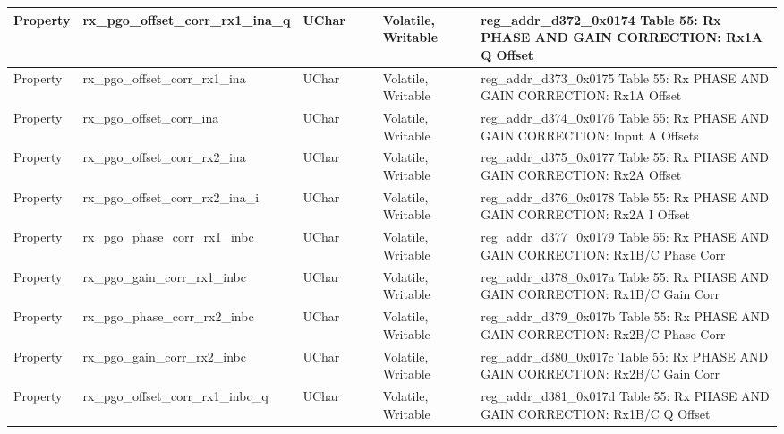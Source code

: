 \documentclass{article}
\begin{document}
\begin{scriptsize}
\begin{longtable}{|p{2cm}|p{5cm}|p{1cm}|p{2cm}|p{2cm}|p{1.75cm}|p{1.5cm}|p{5.1cm}|}
  \hline
  Property & rx\_pgo\_offset\_corr\_rx1\_ina\_q                       & UChar &                  &                  & Volatile,  Writable &         & reg\_addr\_d372\_0x0174 Table 55: Rx PHASE AND GAIN CORRECTION: Rx1A Q Offset \\
  \hline
  Property & rx\_pgo\_offset\_corr\_rx1\_ina                          & UChar &                  &                  & Volatile,  Writable &         & reg\_addr\_d373\_0x0175 Table 55: Rx PHASE AND GAIN CORRECTION: Rx1A Offset \\
  \hline
  Property & rx\_pgo\_offset\_corr\_ina                               & UChar &                  &                  & Volatile,  Writable &         & reg\_addr\_d374\_0x0176 Table 55: Rx PHASE AND GAIN CORRECTION: Input A Offsets \\
  \hline
  Property & rx\_pgo\_offset\_corr\_rx2\_ina                          & UChar &                  &                  & Volatile,  Writable &         & reg\_addr\_d375\_0x0177 Table 55: Rx PHASE AND GAIN CORRECTION: Rx2A Offset \\
  \hline
  Property & rx\_pgo\_offset\_corr\_rx2\_ina\_i                       & UChar &                  &                  & Volatile,  Writable &         & reg\_addr\_d376\_0x0178 Table 55: Rx PHASE AND GAIN CORRECTION: Rx2A I Offset \\
  \hline
  Property & rx\_pgo\_phase\_corr\_rx1\_inbc                          & UChar &                  &                  & Volatile,  Writable &         & reg\_addr\_d377\_0x0179 Table 55: Rx PHASE AND GAIN CORRECTION: Rx1B/C Phase Corr \\
  \hline
  Property & rx\_pgo\_gain\_corr\_rx1\_inbc                           & UChar &                  &                  & Volatile,  Writable &         & reg\_addr\_d378\_0x017a Table 55: Rx PHASE AND GAIN CORRECTION: Rx1B/C Gain Corr \\
  \hline
  Property & rx\_pgo\_phase\_corr\_rx2\_inbc                          & UChar &                  &                  & Volatile,  Writable &         & reg\_addr\_d379\_0x017b Table 55: Rx PHASE AND GAIN CORRECTION: Rx2B/C Phase Corr \\
  \hline
  Property & rx\_pgo\_gain\_corr\_rx2\_inbc                           & UChar &                  &                  & Volatile,  Writable &         & reg\_addr\_d380\_0x017c Table 55: Rx PHASE AND GAIN CORRECTION: Rx2B/C Gain Corr \\
  \hline
  Property & rx\_pgo\_offset\_corr\_rx1\_inbc\_q                      & UChar &                  &                  & Volatile,  Writable &         & reg\_addr\_d381\_0x017d Table 55: Rx PHASE AND GAIN CORRECTION: Rx1B/C Q Offset \\

\end{longtable}
\end{scriptsize}
\end{document}
